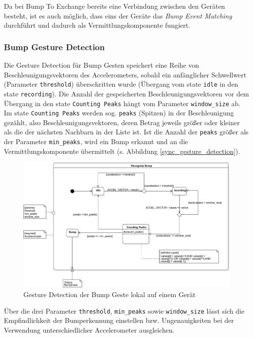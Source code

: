 {Da bei Bump To Exchange bereits eine Verbindung zwischen den Geräten besteht, ist es auch möglich, dass eins der Geräte das \textit{Bump Event Matching} durchführt und dadurch als Vermittlungskomponente fungiert.


\subsubsection*{Bump Gesture Detection}
Die Gesture Detection für Bump Gesten speichert eine Reihe von Beschleunigungsvektoren des Accelerometers, sobald ein anfänglicher Schwellwert (Parameter \texttt{threshold}) überschritten wurde (Übergang vom state \texttt{idle} in den state \texttt{recording}). Die Anzahl der gespeicherten Beschleunigungsvektoren vor dem Übergang in den state \texttt{Counting Peaks} hängt vom Parameter \texttt{win\-dow\_size} ab. Im state \texttt{Counting Peaks} werden sog. \texttt{peaks} (Spitzen) in der Beschleunigung gezählt, also Beschleunigungsvektoren, deren Betrag jeweils größer oder kleiner als die der nächsten Nachbarn in der Liste ist. Ist die Anzahl der \texttt{peaks} größer als der Parameter \texttt{min\_peaks}, wird ein Bump erkannt und an die Vermittlungskomponente übermittelt (s. Abbildung \ref{sync_gesture_detection}).

\begin{figure}[H]
\includegraphics[width=\textwidth]{bump_recognize.png}
\caption{Gesture Detection der Bump Geste lokal auf einem Gerät}
\label{recognize_bump}
\end{figure}

Über die drei Parameter \texttt{threshold}, \texttt{min\_peaks} sowie \texttt{window\_size} lässt sich die Empfindlichkeit der Bumperkennung einstellen bzw. Ungenauigkeiten bei der Verwendung unterschiedlicher Accelerometer ausgleichen.

}
